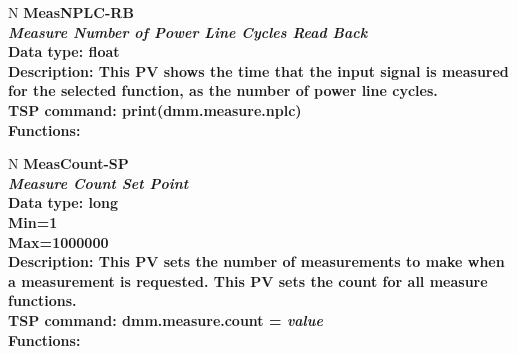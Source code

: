 \documentclass[openany]{article}
\begin{document}
		\begin{tabular}{N}		
			\hline
			\bfseries MeasNPLC-RB\label{pv:measnplc-rb} \\ \hline
			\emph{Measure Number of Power Line Cycles Read Back} \\
			Data type: float \\
			Description: This PV shows the time that the input signal is measured for the selected function, as the number of power line cycles. \\
			TSP command: print(dmm.measure.nplc) \\
			Functions: \\
			\arrayrulecolor{\FuncTableBorderColor}

		\end{tabular}

		\begin{tabular}{N}
			\hline		
			\bfseries MeasCount-SP\label{pv:meascount-sp} \\ \hline
			\emph{Measure Count Set Point} \\
			Data type: long \\
			Min=1 \\
			Max=1000000 \\
			Description: This PV sets the number of measurements to make when a measurement is requested. This PV sets the count for all measure functions. \\
			TSP command: dmm.measure.count = \emph{value} \\
			Functions: \\
			\arrayrulecolor{\FuncTableBorderColor}

		\end{tabular}
\end{document}
